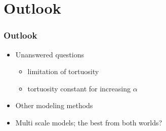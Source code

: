 \documentclass{beamer}
\begin{document}
\section{Outlook}
\begin{frame}
 \frametitle{Outlook}
  \begin{itemize}
   \item Unanswered questions 
   \begin{itemize}
    \item limitation of tortuosity
    \item tortuosity constant for increasing $\alpha$
   \end{itemize}
   \item Other modeling methods
   \item Multi scale models; the best from both worlds?
  \end{itemize}
% 
\end{frame}

\end{document}
